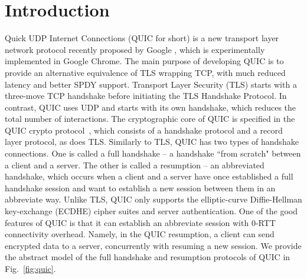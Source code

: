 \section{Introduction} \label{sec:intro}
Quick UDP Internet Connections (QUIC for short) is a
new transport layer network protocol recently proposed
by Google \cite{QUIC}, which is experimentally
implemented in Google Chrome.
The main purpose of developing QUIC is to provide an
alternative equivalence of TLS wrapping TCP, with much
reduced latency and better SPDY support.
Transport Layer Security (TLS) starts with a three-move
TCP handshake before initiating the TLS Handshake
Protocol.
In contrast, QUIC uses UDP and starts with its own
handshake, which reduces the total number of
interactions.
The cryptographic core of QUIC is specified in the QUIC
crypto protocol~\cite{QUIC:Crypto}, which consists of a
handshake protocol and a record layer protocol, as does
TLS.
Similarly to TLS, QUIC has two types of handshake
connections.
One is called a full handshake -- a handshake
``from scratch" between a client and a server.
The other is called a resumption -- an abbreviated
handshake, which occurs when a client and a server have
once established a full handshake session and want to
establish a new session between them in an abbreviate
way.
Unlike TLS, QUIC only supports the elliptic-curve
Diffie-Hellman key-exchange (ECDHE) cipher suites and
server authentication.
%
One of the good features of QUIC is that it can
establish an abbreviate session with $0$-RTT
connectivity overhead.
Namely, in the QUIC resumption, a client can send
encrypted data to a server, concurrently with resuming
a new session.
We provide the abstract model of the full handshake and
resumption protocols of QUIC in Fig.~\ref{fig:quic}.

